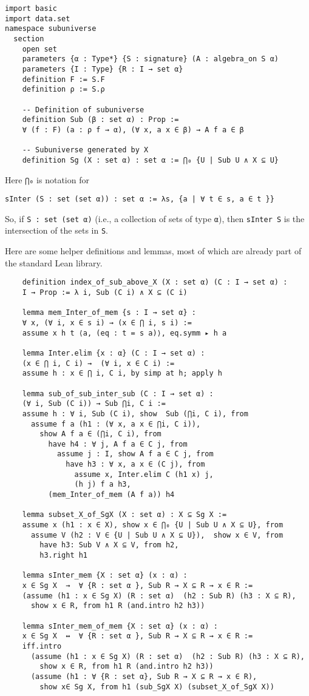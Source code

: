 \documentclass[12pt]{amsart}  %
\begin{document}
\begin{lstlisting}
import basic
import data.set
namespace subuniverse
  section
    open set
    parameters {α : Type*} {S : signature} (A : algebra_on S α) 
    parameters {I : Type} {R : I → set α} 
    definition F := S.F
    definition ρ := S.ρ 

    -- Definition of subuniverse
    definition Sub (β : set α) : Prop :=
    ∀ (f : F) (a : ρ f → α), (∀ x, a x ∈ β) → A f a ∈ β
  
    -- Subuniverse generated by X
    definition Sg (X : set α) : set α := ⋂₀ {U | Sub U ∧ X ⊆ U}
\end{lstlisting}  
Here \lstinline{⋂₀} is notation for 
\begin{lstlisting}
sInter (S : set (set α)) : set α := λs, {a | ∀ t ∈ s, a ∈ t }}
\end{lstlisting}
So, if \lstinline{S : set (set α)} (i.e., a collection of sets of type \lstinline{α}),
then \lstinline{sInter S} is the intersection of the sets in \lstinline{S}.

Here are some helper definitions and lemmas, most of which are already part of the standard Lean library.
\begin{lstlisting}
    definition index_of_sub_above_X (X : set α) (C : I → set α) : 
    I → Prop := λ i, Sub (C i) ∧ X ⊆ (C i) 
  
    lemma mem_Inter_of_mem {s : I → set α} : 
    ∀ x, (∀ i, x ∈ s i) → (x ∈ ⋂ i, s i) :=
    assume x h t ⟨a, (eq : t = s a)⟩, eq.symm ▸ h a
  
    lemma Inter.elim {x : α} (C : I → set α) : 
    (x ∈ ⋂ i, C i) →  (∀ i, x ∈ C i) := 
    assume h : x ∈ ⋂ i, C i, by simp at h; apply h
    
    lemma sub_of_sub_inter_sub (C : I → set α) : 
    (∀ i, Sub (C i)) → Sub ⋂i, C i :=
    assume h : ∀ i, Sub (C i), show  Sub (⋂i, C i), from 
      assume f a (h1 : (∀ x, a x ∈ ⋂i, C i)), 
        show A f a ∈ (⋂i, C i), from 
          have h4 : ∀ j, A f a ∈ C j, from 
            assume j : I, show A f a ∈ C j, from 
              have h3 : ∀ x, a x ∈ (C j), from 
                assume x, Inter.elim C (h1 x) j,
                (h j) f a h3,
          (mem_Inter_of_mem (A f a)) h4

    lemma subset_X_of_SgX (X : set α) : X ⊆ Sg X := 
    assume x (h1 : x ∈ X), show x ∈ ⋂₀ {U | Sub U ∧ X ⊆ U}, from 
      assume V (h2 : V ∈ {U | Sub U ∧ X ⊆ U}),  show x ∈ V, from 
        have h3: Sub V ∧ X ⊆ V, from h2, 
        h3.right h1
  
    lemma sInter_mem {X : set α} (x : α) : 
    x ∈ Sg X  →  ∀ {R : set α }, Sub R → X ⊆ R → x ∈ R := 
    (assume (h1 : x ∈ Sg X) (R : set α)  (h2 : Sub R) (h3 : X ⊆ R), 
      show x ∈ R, from h1 R (and.intro h2 h3))
  
    lemma sInter_mem_of_mem {X : set α} (x : α) : 
    x ∈ Sg X  ↔  ∀ {R : set α }, Sub R → X ⊆ R → x ∈ R := 
    iff.intro
      (assume (h1 : x ∈ Sg X) (R : set α)  (h2 : Sub R) (h3 : X ⊆ R), 
        show x ∈ R, from h1 R (and.intro h2 h3))
      (assume (h1 : ∀ {R : set α}, Sub R → X ⊆ R → x ∈ R), 
        show x∈ Sg X, from h1 (sub_SgX X) (subset_X_of_SgX X))
\end{lstlisting}  
\end{document}
